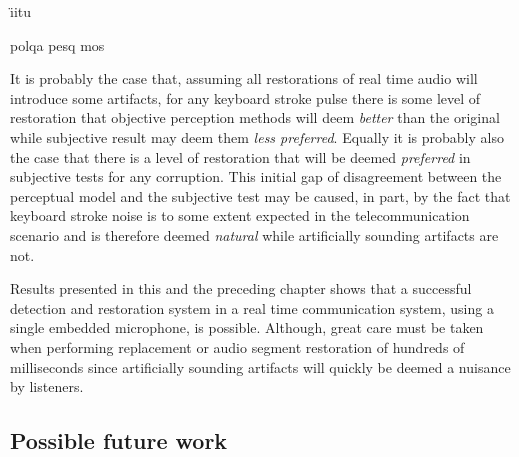 \DIFaddbegin \label{corrections:conclusionSubjective}\"{\i}\gls{itu} 

\emph{} \emph{} \gls{polqa} \gls{pesq} \gls{mos} 

\DIFaddend It is probably the case that, assuming all restorations of real time audio will introduce some artifacts, for any keyboard stroke pulse there is some level of restoration that objective perception methods will deem \emph{better} than the original while subjective result may deem them \emph{less preferred}. Equally it is probably also the case that there is a level of restoration that will be deemed \emph{preferred} in subjective tests for any corruption. This initial gap of disagreement between the perceptual model and the subjective test may be caused, in part, by the fact that keyboard stroke noise is to some extent expected in the telecommunication scenario and is therefore deemed \emph{natural} while artificially sounding artifacts are not.

Results presented in this and the preceding chapter shows that a successful detection and restoration system in a real time communication system, using a single embedded microphone, is possible. Although, great care must be taken when performing replacement or audio segment restoration of hundreds of milliseconds since artificially sounding artifacts will quickly be deemed a nuisance by listeners.

\subsection{Possible future work}

